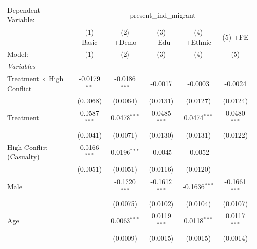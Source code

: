 
\begingroup
\centering
\begin{tabular}{lccccc}
   \tabularnewline \midrule \midrule
   Dependent Variable: & \multicolumn{5}{c}{present\_ind\_migrant}\\
                                     & (1) Basic      & (2) +Demo                      & (3) +Edu                & (4) +Ethnic             & (5) +FE \\   
   Model:                            & (1)            & (2)                            & (3)                     & (4)                     & (5)\\  
   \midrule
   \emph{Variables}\\
   Treatment $\times$ High Conflict  & -0.0179$^{**}$ & -0.0186$^{***}$                & -0.0017                 & -0.0003                 & -0.0024\\   
                                     & (0.0068)       & (0.0064)                       & (0.0131)                & (0.0127)                & (0.0124)\\   
   Treatment                         & 0.0587$^{***}$ & 0.0478$^{***}$                 & 0.0485$^{***}$          & 0.0474$^{***}$          & 0.0480$^{***}$\\   
                                     & (0.0041)       & (0.0071)                       & (0.0130)                & (0.0131)                & (0.0122)\\   
   High Conflict (Casualty)          & 0.0166$^{***}$ & 0.0196$^{***}$                 & -0.0045                 & -0.0052                 &   \\   
                                     & (0.0051)       & (0.0051)                       & (0.0116)                & (0.0120)                &   \\   
   Male                              &                & -0.1320$^{***}$                & -0.1612$^{***}$         & -0.1636$^{***}$         & -0.1661$^{***}$\\   
                                     &                & (0.0075)                       & (0.0102)                & (0.0104)                & (0.0107)\\   
   Age                               &                & 0.0063$^{***}$                 & 0.0119$^{***}$          & 0.0118$^{***}$          & 0.0117$^{***}$\\   
                                     &                & (0.0009)                       & (0.0015)                & (0.0015)                & (0.0014)\\   

\end{tabular}
